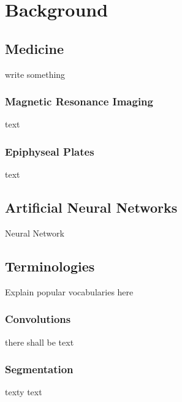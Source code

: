 \section{Background}

\subsection{Medicine}

write something

\subsubsection{Magnetic Resonance Imaging}

text

\subsubsection{Epiphyseal Plates}

text

\subsection{Artificial Neural Networks}

Neural Network

\subsection{Terminologies}

Explain popular vocabularies here

\subsubsection{Convolutions}

there shall be text

\subsubsection{Segmentation}

texty text

\newpage
